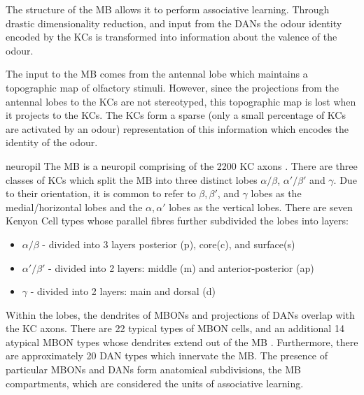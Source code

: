\documentclass[11pt, A4]{article}
\begin{document}
\begin{multicols}{2}
The structure of the MB allows it to perform associative learning. Through drastic dimensionality reduction, and input from the DANs the odour identity encoded by the KCs is transformed into information about the valence of the odour.

The input to the MB comes from the antennal lobe which maintains a topographic map of olfactory stimuli. However, since the projections from the antennal lobes to the KCs are not stereotyped, this topographic map is lost when it projects to the KCs. The KCs form a sparse  (only a small percentage of KCs are activated by an odour) representation of this information which encodes the identity of the odour.

		
neuropil
The MB is a neuropil comprising of the 2200 KC axons \cite{aso2014neuronal}. There are three classes of KCs which split the MB into three distinct lobes $\alpha /\beta$, $\alpha' /\beta'$ and $\gamma$. Due to their orientation, it is common to refer to  
$\beta, \beta' $, and $\gamma$ lobes as the medial/horizontal lobes and the $\alpha, \alpha'$ lobes as the vertical lobes. There are seven Kenyon Cell types whose parallel fibres further subdivided the lobes into layers:

\begin{itemize}
\itemsep0pt
\item  $\alpha /\beta$ - divided into 3 layers posterior (p), core(c), and surface(s)
\item $\alpha' /\beta'$ - divided into 2 layers: middle (m) and anterior-posterior (ap)
\item  $\gamma$ - divided into 2 layers: main and dorsal (d)
\end{itemize}


Within the lobes, the dendrites of MBONs and projections of DANs overlap with the KC axons. There are 22 typical types of MBON cells,  and an additional 14 atypical MBON types whose dendrites extend out of the MB  \cite{li2020connectome}. Furthermore, there are approximately 20 DAN types which innervate the MB. The presence of particular MBONs and DANs form anatomical subdivisions, the MB compartments, which are considered the units of associative learning. %


\end{multicols}
\end{document}
